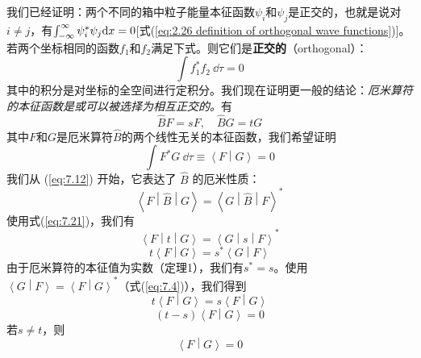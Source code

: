     我们已经证明：两个不同的箱中粒子能量本征函数$\psi_i$和$\psi_j$是正交的，也就是说对$i \neq j$，有$\int_{-\infty}^{\infty} \psi_i^{\ast}\psi_j \dd x = 0$[式(\ref{eq:2.26 definition of orthogonal wave functions})]。若两个坐标相同的函数$f_1$和$f_2$满足下式。则它们是\textbf{正交的}（orthogonal）：
    \begin{equation}
        \boxed{
            \int f_1^{\ast} f_2 \:\dd \tau = 0
        }
        \label{eq:7.20}
    \end{equation}
    其中的积分是对坐标的全空间进行定积分。我们现在证明更一般的结论：\textit{厄米算符的本征函数是或可以被选择为相互正交的。}有
    \begin{equation}
        \hat{B}F = sF, \quad \hat{B}G = tG
        \label{eq:7.21}
    \end{equation}
    其中$F$和$G$是厄米算符$\hat{B}$的两个线性无关的本征函数，我们希望证明
    \begin{equation*}
        \int F^{\ast} G \:\dd \tau \equiv \left\langle F \middle| G \right\rangle = 0
    \end{equation*}
    我们从 (\ref{eq:7.12}) 开始，它表达了 $\hat{B}$ 的厄米性质：
    \begin{equation*}
        \left\langle F \middle| \hat{B} \middle| G \right\rangle = \left\langle G \middle| \hat{B} \middle| F \right\rangle^{\ast}
    \end{equation*}
    使用式(\ref{eq:7.21})，我们有
    \begin{equation*}
        \left\langle F \middle| t \middle| G \right\rangle = \left\langle G \middle| s \middle| F \right\rangle^{\ast}
    \end{equation*}
    \begin{equation*}
        t \left\langle F \middle| G \right\rangle = s^{\ast} \left\langle G \middle| F \right\rangle
    \end{equation*}
    由于厄米算符的本征值为实数（定理1），我们有$s^{\ast} = s$。使用$\left\langle G \middle| F \right\rangle = \left\langle F \middle| G \right\rangle^{\ast}$（式(\ref{eq:7.4})），我们得到
    \begin{equation*}
        t \left\langle F \middle| G \right\rangle = s \left\langle F \middle| G \right\rangle
    \end{equation*}
    \begin{equation*}
        \left(t - s\right) \left\langle F \middle| G \right\rangle = 0
    \end{equation*}
    若$s \neq t$，则
    \begin{equation}
        \left\langle F \middle| G \right\rangle = 0
        \label{eq:7.22}
    \end{equation}

